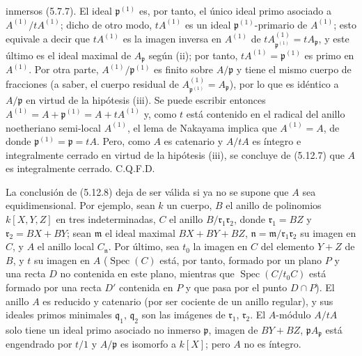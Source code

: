 
inmersos (5.7.7). El ideal $\mathfrak p^{(1)}$ es, por tanto, el único ideal
primo asociado a $A^{(1)}/tA^{(1)}$; dicho de otro modo, $tA^{(1)}$ es un ideal
$\mathfrak p^{(1)}$-primario de $A^{(1)}$; esto equivale a decir que
$tA^{(1)}$ es la imagen inversa en $A^{(1)}$ de
$tA^{(1)}_{\mathfrak p^{(1)}}=tA_{\mathfrak p}$, y este último es el ideal
maximal de $A_{\mathfrak p}$ según (ii); por tanto,
$tA^{(1)}=\mathfrak p^{(1)}$ es primo en $A^{(1)}$. Por otra parte,
$A^{(1)}/\mathfrak p^{(1)}$ es finito sobre $A/\mathfrak p$ y tiene el mismo
cuerpo de fracciones (a saber, el cuerpo residual de
$A^{(1)}_{\mathfrak p^{(1)}}=A_{\mathfrak p}$), por lo que es idéntico a
$A/\mathfrak p$ en virtud de la hipótesis (iii). Se puede escribir entonces
$A^{(1)}=A+\mathfrak p^{(1)}=A+tA^{(1)}$ y, como $t$ está contenido en el
radical del anillo noetheriano semi-local $A^{(1)}$, el lema de Nakayama
implica que $A^{(1)}=A$, de donde $\mathfrak p^{(1)}=\mathfrak p=tA$. Pero,
como $A$ es catenario y $A/tA$ es íntegro e integralmente cerrado en virtud de
la hipótesis (iii), se concluye de (5.12.7) que $A$ es integralmente cerrado.
C.Q.F.D.

\begin{remark}[5.12.9]
\label{IV.2.s5.12.9-fr}
La conclusión de (5.12.8) deja de ser válida si ya no se supone que $A$ sea
equidimensional. Por ejemplo, sean $k$ un cuerpo, $B$ el anillo de polinomios
$k[X,Y,Z]$ en tres indeterminadas, $C$ el anillo
$B/\mathfrak r_1\mathfrak r_2$, donde $\mathfrak r_1=BZ$ y
$\mathfrak r_2=BX+BY$; sean $\mathfrak m$ el ideal maximal $BX+BY+BZ$,
$\mathfrak n=\mathfrak m/\mathfrak r_1\mathfrak r_2$ su imagen en $C$, y $A$
el anillo local $C_{\mathfrak n}$. Por último, sea $t_0$ la imagen en $C$ del
elemento $Y+Z$ de $B$, y $t$ su imagen en $A$
($\operatorname{Spec}(C)$ está, por tanto, formado por un plano $P$ y una
recta $D$ no contenida en este plano, mientras que
$\operatorname{Spec}(C/t_0C)$ está formado por una recta $D'$ contenida en $P$
y que pasa por el punto $D\cap P$). El anillo $A$
es reducido y catenario (por ser cociente de un anillo regular), y sus ideales
primos minimales $\mathfrak q_1$, $\mathfrak q_2$ son las imágenes de
$\mathfrak r_1$, $\mathfrak r_2$. El $A$-módulo $A/tA$ solo tiene un ideal
primo asociado no inmerso $\mathfrak p$, imagen de $BY+BZ$,
$\mathfrak pA_{\mathfrak p}$ está engendrado por $t/1$ y $A/\mathfrak p$ es
isomorfo a $k[X]$; pero $A$ no es íntegro.
\end{remark}
